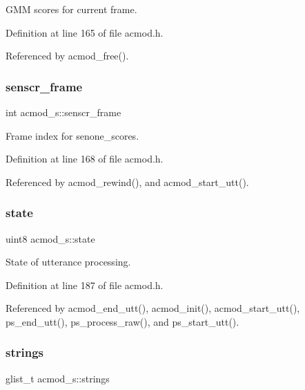 G\+MM scores for current frame. 



Definition at line 165 of file acmod.\+h.



Referenced by acmod\+\_\+free().

\mbox{\label{structacmod__s_ab70ba4caf96b656936d499247e921f00}} 
\subsubsection{senscr\+\_\+frame}
{\footnotesize\ttfamily int acmod\+\_\+s\+::senscr\+\_\+frame}



Frame index for senone\+\_\+scores. 



Definition at line 168 of file acmod.\+h.



Referenced by acmod\+\_\+rewind(), and acmod\+\_\+start\+\_\+utt().

\mbox{\label{structacmod__s_a06adf606c11e6f4b9869742510a5c23b}} 
\subsubsection{state}
{\footnotesize\ttfamily uint8 acmod\+\_\+s\+::state}



State of utterance processing. 



Definition at line 187 of file acmod.\+h.



Referenced by acmod\+\_\+end\+\_\+utt(), acmod\+\_\+init(), acmod\+\_\+start\+\_\+utt(), ps\+\_\+end\+\_\+utt(), ps\+\_\+process\+\_\+raw(), and ps\+\_\+start\+\_\+utt().

\mbox{\label{structacmod__s_a9f6b699a0fbd43cf7ababab6f0ab81be}} 
\subsubsection{strings}
{\footnotesize\ttfamily glist\+\_\+t acmod\+\_\+s\+::strings}



